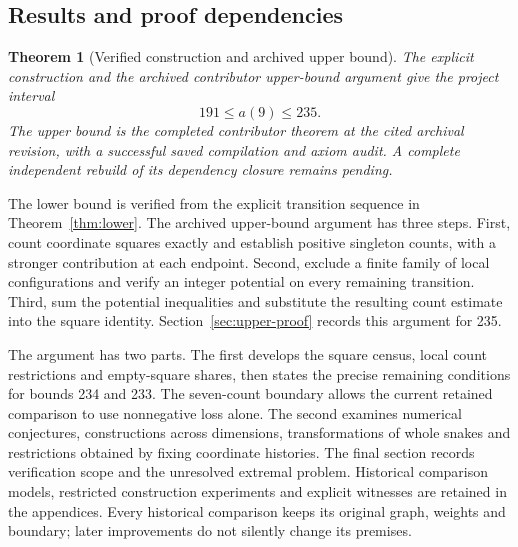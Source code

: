 \documentclass[11pt,a4paper]{article}
\newtheorem{theorem}{Theorem}[section]
\theoremstyle{definition}
\theoremstyle{remark}
\begin{document}
\subsection{Results and proof dependencies}
\begin{theorem}[Verified construction and archived upper bound]\label{thm:main}
The explicit construction and the archived contributor upper-bound argument
give the project interval
\[
\boxed{191\le a(9)\le235.}
\]
The upper bound is the completed contributor theorem at the cited archival
revision, with a successful saved compilation and axiom audit. A complete
independent rebuild of its dependency closure remains pending.
\end{theorem}
The lower bound is verified from the explicit transition sequence in Theorem~\ref{thm:lower}. The archived upper-bound argument has three steps. First, count coordinate squares exactly and establish positive singleton counts, with a stronger contribution at each endpoint. Second, exclude a finite family of local configurations and verify an integer potential on every remaining transition. Third, sum the potential inequalities and substitute the resulting count estimate into the square identity. Section~\ref{sec:upper-proof} records this argument for 235.

The argument has two parts. The first develops the square census,
local count restrictions and empty-square shares, then states the precise
remaining conditions for bounds 234 and 233. The seven-count boundary
allows the current retained comparison to use nonnegative loss alone.
The second examines numerical conjectures, constructions across
dimensions, transformations of whole snakes and restrictions obtained
by fixing coordinate histories. The final section records verification
scope and the unresolved extremal problem. Historical comparison models,
restricted construction experiments and explicit witnesses are retained
in the appendices. Every historical comparison keeps its original graph,
weights and boundary; later improvements do not silently change its premises.
\end{document}
